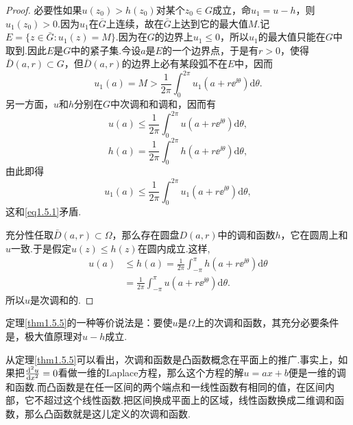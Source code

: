 \begin{proof}
		必要性\quad 如果$u(z_0)>h(z_0)$对某个$z_0\in G$成立，命$u_1=u-h$，则$u_1(z_0)>0$.因为$u_1$在$\overline{G}$上连续，故在$\bar{G}$上达到它的最大值$M$.记$E=\{z\in\bar{G}\colon u_1(z)=M\}$.因为在$G$的边界上$u_1\le0$，所以$u_1$的最大值只能在$G$中取到.因此$E$是$G$中的紧子集.今设$a$是$E$的一个边界点，于是有$r>0$，使得$\bar{D}(a,r)\subset G$，但$\bar{D}(a,r)$的边界上必有某段弧不在$E$中，因而
		\begin{equation}\label{eq1.5.1}
			u_1(a)=M>\frac1{2\pi} \int_{0}^{2\pi} u_1(a+r\ee^{\ii\theta})\mathrm{d}\theta.
		\end{equation}
	另一方面，$u$和$h$分别在$G$中次调和和调和，因而有
	\[u(a)\le\frac1{2\pi}\int_{0}^{2\pi} u(a+r\ee^{\ii\theta})\mathrm{d}\theta,\]
	\[h(a)=\frac1{2\pi}\int_{0}^{2\pi}h(a+r\ee^{\ii\theta})\mathrm{d}\theta,\]
	由此即得
	\[u_1(a)\le\frac1{2\pi}\int_{0}^{2\pi}u_1(a+r\ee^{\ii\theta})\mathrm{d}\theta,\]
	这和\eqref{eq1.5.1}矛盾.
	
		充分性\quad 任取$\bar{D}(a,r)\subset\Omega$，那么存在圆盘$D(a,r)$中的调和函数$h$，它在圆周上和$u$一致.于是假定$u(z)\le h(z)$在圆内成立.这样,
		\begin{align*}
			u(a)
			&\le h(a)=\frac1{2\pi}\int_{-\pi}^{\pi} h(a+r\ee^{\ii\theta})\mathrm{d}\theta\\
			&=\frac1{2\pi}\int_{-\pi}^{\pi}u(a+r\ee^{\ii\theta})\mathrm{d}\theta.
		\end{align*}
	所以$u$是次调和的.
\end{proof}
定理\ref{thm1.5.5}的一种等价说法是：要使$u$是$\Omega$上的次调和函数，其充分必要条件是，极大值原理对$u-h$成立.

从定理\ref{thm1.5.5}可以看出，次调和函数是凸函数概念在平面上的推广.事实上，如果把$\frac{\mathop{}\!\mathrm d^2u}{\mathop{}\!\mathrm dx^2}=0$看做一维的Laplace方程，那么这个方程的解$u=ax+b$便是一维的调和函数.而凸函数是在任一区间的两个端点和一线性函数有相同的值，在区间内部，它不超过这个线性函数.把区间换成平面上的区域，线性函数换成二维调和函数，那么凸函数就是这儿定义的次调和函数.

